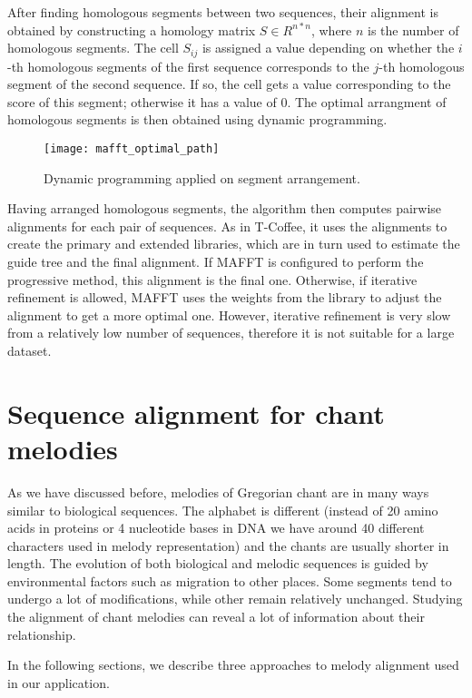 After finding homologous segments between two sequences, their alignment is obtained by constructing a homology matrix $S \in R^{n*n}$, where $n$ is the number of homologous
segments. The cell $S_{ij}$ is assigned a value depending on whether the $i$-th homologous segments of the first sequence corresponds to the $j$-th homologous segment
of the second sequence. If so, the cell gets a value corresponding to the score of this segment; otherwise it has a value of 0. The optimal arrangment of homologous segments
is then obtained using dynamic programming.

\begin{figure}[h]
\centering
\texttt{[image: mafft\_optimal\_path]}
\caption{Dynamic programming applied on segment arrangement. \citep[Figure~2A]{mafft}}
\label{fig:mafft3}
\end{figure}

Having arranged homologous segments, the algorithm then computes pairwise alignments for each pair of sequences. As in T-Coffee, it uses the alignments to create
the primary and extended libraries, which are in turn used to estimate the guide tree and the final alignment. If MAFFT is configured to perform the progressive 
method, this alignment is the final one. Otherwise, if iterative refinement is allowed, MAFFT uses the weights from the library to adjust the alignment to get a more
optimal one. However, iterative refinement is very slow from a relatively low number of sequences, therefore it is not suitable for a large dataset.

\section{Sequence alignment for chant melodies}

As we have discussed before, melodies of Gregorian chant are in many ways similar to biological sequences. The alphabet is different (instead of 20 amino acids
in proteins or 4 nucleotide bases in DNA we have around 40 different characters used in melody representation) and the chants are usually shorter in length.
The evolution of both biological and melodic sequences is guided by environmental factors such as migration to other places. Some segments tend to undergo a lot
of modifications, while other remain relatively unchanged. Studying the alignment of chant melodies can reveal a lot of information about their relationship.

In the following sections, we describe three approaches to melody alignment used in our application.

